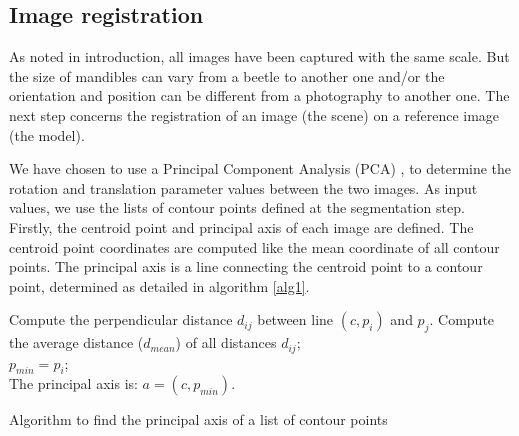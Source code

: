 \documentclass[twoside,twocolumn,10pt]{article}
\begin{document}
\subsection{Image registration}

As noted in introduction, all images have been captured with the same scale.
But the size of mandibles can vary from a beetle to another one and/or the orientation and position can be different from a photography to another one.
The next step concerns the registration of an image (the scene) on a
reference image (the model).

We have chosen to use a Principal Component Analysis (PCA) \cite{bsspca}, \cite{shlens2014tutorial} to determine the rotation and translation parameter values between the two images.
As input values, we use the lists of contour points defined at the segmentation step.
Firstly, the centroid point and principal axis of each image are defined.
The centroid point coordinates are computed like the mean coordinate of all contour points.
The principal axis is a line connecting the centroid point to a contour point, determined as detailed in algorithm \ref{alg1}.

\begin{algorithm}
	{
		{
			{
				Compute the perpendicular distance $d_{ij}$ between line $(c,p_i)$ and $p_j$.
			}		
		}
		Compute the average distance ($d_{mean}$) of all distances $d_{ij}$;\\

		{
			$p_{min} = p_i$;\\
		}
	}
	The principal axis is: $a = (c,p_{min})$.
	\caption{Algorithm to find the principal axis of a list of contour points}
	\label{alg1}
\end{algorithm}
\end{document}
